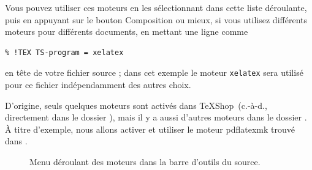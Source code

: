\documentclass[11pt,french]{article}
\newcommand{\TS}{\textsf{\TeX Shop}}
\newcommand{\cmd}[1]{\textsf{#1}}
\newcommand{\mnu}[1]{\textsf{#1}}
\begin{document}
Vous pouvez utiliser ces moteurs en les sélectionnant dans cette liste déroulante, puis en appuyant sur le bouton \mnu{Composition} ou mieux, si vous utilisez différents moteurs pour différents documents, en mettant une ligne comme

%
\begin{verbatim}
% !TEX TS-program = xelatex
\end{verbatim}
en tête de votre fichier source ; dans cet exemple le moteur \texttt{xelatex} sera utilisé pour ce fichier indépendamment des autres choix.

D'origine, seuls quelques moteurs sont activés dans \TS\ (c.-à-d., directement dans le dossier ), mais il y a aussi d'autres moteurs dans le dossier . À titre d'exemple, nous allons activer et utiliser le moteur \cmd{pdflatexmk} trouvé dans .

\begin{figure}
{}
\caption{Menu déroulant des moteurs dans la barre d'outils du source.\label{EnginesPopup}}
\end{figure}
\end{document}
